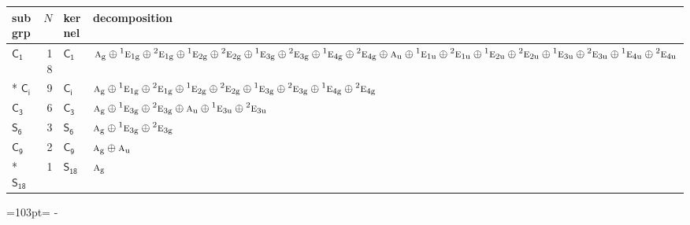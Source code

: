 \documentclass[10pt,a4paper]{article}
\newcommand{\needspace}[1]{\par\penalty-100\begingroup\dimen0=#1\relax\dimen2=\pagegoal
  \advance\dimen2-\pagetotal\ifdim\dimen0>\dimen2\relax\ifdim\dimen2>0pt\vfil\break\fi\fi
  \endgroup}
\numberwithin{equation}{section}
\newcommand{\grp}[1]{\mathsf{#1}}
\newcommand{\irr}[1]{\text{\normalfont\scshape #1}}
\newcommand{\conjpair}[1]{{}^{#1}}
\newcommand{\ptag}[1]{\mathrm{#1}}
\newlength{\fillwidth}\newlength{\cellwidth}\newlength{\colwidth}
\begin{document}
{\begin{longtable}{@{}lrl>{\RaggedRight\arraybackslash}p{\fillwidth}@{}}
subgrp & $N$ & kernel & decomposition\\\midrule\endhead
\bottomrule\endfoot\endlastfoot
\href{C1.pdf}{$\grp{C_{1}}$} & 18 & \href{C1.pdf}{$\grp{C_{1}}$} & $\irr{a}_{\ptag{g}}\oplus \conjpair{1}\irr{e}_{1\ptag{g}}\oplus \conjpair{2}\irr{e}_{1\ptag{g}}\oplus \conjpair{1}\irr{e}_{2\ptag{g}}\oplus \conjpair{2}\irr{e}_{2\ptag{g}}\oplus \conjpair{1}\irr{e}_{3\ptag{g}}\oplus \conjpair{2}\irr{e}_{3\ptag{g}}\oplus \conjpair{1}\irr{e}_{4\ptag{g}}\oplus \conjpair{2}\irr{e}_{4\ptag{g}}\oplus \irr{a}_{\ptag{u}}\oplus \conjpair{1}\irr{e}_{1\ptag{u}}\oplus \conjpair{2}\irr{e}_{1\ptag{u}}\oplus \conjpair{1}\irr{e}_{2\ptag{u}}\oplus \conjpair{2}\irr{e}_{2\ptag{u}}\oplus \conjpair{1}\irr{e}_{3\ptag{u}}\oplus \conjpair{2}\irr{e}_{3\ptag{u}}\oplus \conjpair{1}\irr{e}_{4\ptag{u}}\oplus \conjpair{2}\irr{e}_{4\ptag{u}}$\\*
\href{S2.pdf}{$\grp{C_{i}}$} & 9 & \href{S2.pdf}{$\grp{C_{i}}$} & $\irr{a}_{\ptag{g}}\oplus \conjpair{1}\irr{e}_{1\ptag{g}}\oplus \conjpair{2}\irr{e}_{1\ptag{g}}\oplus \conjpair{1}\irr{e}_{2\ptag{g}}\oplus \conjpair{2}\irr{e}_{2\ptag{g}}\oplus \conjpair{1}\irr{e}_{3\ptag{g}}\oplus \conjpair{2}\irr{e}_{3\ptag{g}}\oplus \conjpair{1}\irr{e}_{4\ptag{g}}\oplus \conjpair{2}\irr{e}_{4\ptag{g}}$\\
\href{C3.pdf}{$\grp{C_{3}}$} & 6 & \href{C3.pdf}{$\grp{C_{3}}$} & $\irr{a}_{\ptag{g}}\oplus \conjpair{1}\irr{e}_{3\ptag{g}}\oplus \conjpair{2}\irr{e}_{3\ptag{g}}\oplus \irr{a}_{\ptag{u}}\oplus \conjpair{1}\irr{e}_{3\ptag{u}}\oplus \conjpair{2}\irr{e}_{3\ptag{u}}$\\
\href{S6.pdf}{$\grp{S_{6}}$} & 3 & \href{S6.pdf}{$\grp{S_{6}}$} & $\irr{a}_{\ptag{g}}\oplus \conjpair{1}\irr{e}_{3\ptag{g}}\oplus \conjpair{2}\irr{e}_{3\ptag{g}}$\\
\href{C9.pdf}{$\grp{C_{9}}$} & 2 & \href{C9.pdf}{$\grp{C_{9}}$} & $\irr{a}_{\ptag{g}}\oplus \irr{a}_{\ptag{u}}$\\*
\href{S18.pdf}{$\grp{S_{18}}$} & 1 & \href{S18.pdf}{$\grp{S_{18}}$} & $\irr{a}_{\ptag{g}}$\\
\bottomrule\end{longtable}}
\needspace{103pt}
\end{document}
